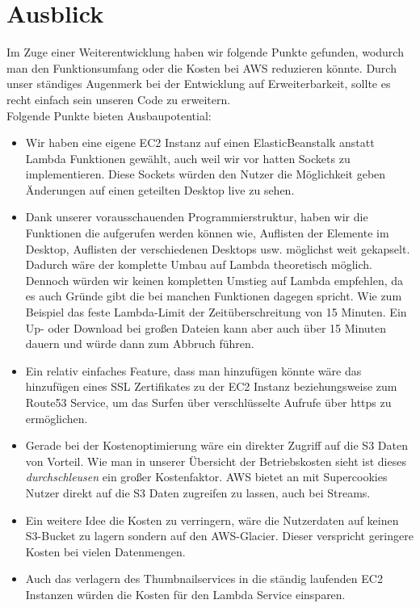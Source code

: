\documentclass[a4paper, 12pt]{scrreprt}
\renewcommand\_{\textunderscore\allowbreak}
\begin{document}
\chapter{Ausblick}
Im Zuge einer Weiterentwicklung haben wir folgende Punkte gefunden, wodurch man den Funktionsumfang oder die Kosten bei AWS reduzieren könnte. Durch unser ständiges Augenmerk bei der Entwicklung auf Erweiterbarkeit, sollte es recht einfach sein unseren Code zu erweitern. \\
Folgende Punkte bieten Ausbaupotential:
\begin{itemize}
\item Wir haben eine eigene EC2 Instanz auf einen ElasticBeanstalk anstatt Lambda Funktionen gewählt, auch weil wir vor hatten Sockets zu implementieren. Diese Sockets würden den Nutzer die Möglichkeit geben Änderungen auf einen geteilten Desktop live zu sehen. 
\item Dank unserer vorausschauenden Programmierstruktur, haben wir die Funktionen die aufgerufen werden können wie, Auflisten der Elemente im Desktop, Auflisten der verschiedenen Desktops usw. möglichst weit gekapselt. Dadurch wäre der komplette Umbau auf Lambda theoretisch möglich. Dennoch würden wir keinen kompletten Umstieg auf Lambda empfehlen, da es auch Gründe gibt die bei manchen Funktionen dagegen spricht. Wie zum Beispiel das feste Lambda-Limit der Zeitüberschreitung von 15 Minuten. Ein Up- oder Download bei großen Dateien kann aber auch über 15 Minuten dauern und würde dann zum Abbruch führen.
\item Ein relativ einfaches Feature, dass man hinzufügen könnte wäre das hinzufügen eines SSL Zertifikates zu der EC2 Instanz beziehungsweise zum Route53 Service, um das Surfen über verschlüsselte Aufrufe über https zu ermöglichen. 
\item Gerade bei der Kostenoptimierung wäre ein direkter Zugriff auf die S3 Daten von Vorteil. Wie man in unserer Übersicht der Betriebskosten sieht ist dieses \emph{durchschleusen} ein großer Kostenfaktor. AWS bietet an mit Supercookies Nutzer direkt auf die S3 Daten zugreifen zu lassen, auch bei Streams.
\item Ein weitere Idee die Kosten zu verringern, wäre die Nutzerdaten auf keinen S3-Bucket zu lagern sondern auf den AWS-Glacier. Dieser verspricht geringere Kosten bei vielen Datenmengen.
\item Auch das verlagern des Thumbnailservices in die ständig laufenden EC2 Instanzen würden die Kosten für den Lambda Service einsparen.
\end{itemize}


\clearpage


%
\end{document}

